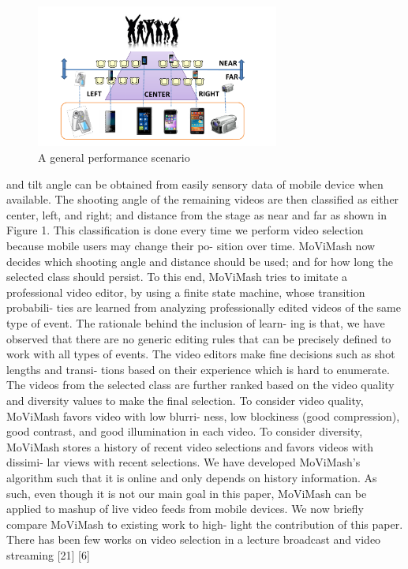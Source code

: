 \documentclass{sig-alternate}
\begin{document}
\begin{figure}[tL]
\includegraphics[width=8cm]{1}
\centering
\caption{A general performance scenario}
\label{fig:figure1}
\end{figure}

and tilt angle can be obtained from easily sensory data of mobile
device when available.
The shooting angle of the remaining videos are then classified as
either center, left, and right; and distance from the stage as near and
far as shown in Figure 1. This classification is done every time we
perform video selection because mobile users may change their po-
sition over time. MoViMash now decides which shooting angle and
distance should be used; and for how long the selected class should
persist. To this end, MoViMash tries to imitate a professional video
editor, by using a finite state machine, whose transition probabili-
ties are learned from analyzing professionally edited videos of the
same type of event. The rationale behind the inclusion of learn-
ing is that, we have observed that there are no generic editing rules
that can be precisely defined to work with all types of events. The
video editors make fine decisions such as shot lengths and transi-
tions based on their experience which is hard to enumerate.
The videos from the selected class are further ranked based on
the video quality and diversity values to make the final selection.
To consider video quality, MoViMash favors video with low blurri-
ness, low blockiness (good compression), good contrast, and good
illumination in each video. To consider diversity, MoViMash stores
a history of recent video selections and favors videos with dissimi-
lar views with recent selections.
We have developed MoViMash’s algorithm such that it is online
and only depends on history information. As such, even though
it is not our main goal in this paper, MoViMash can be applied to
mashup of live video feeds from mobile devices.
We now briefly compare MoViMash to existing work to high-
light the contribution of this paper. There has been few works on
video selection in a lecture broadcast and video streaming [21] [6]
\end{document}
